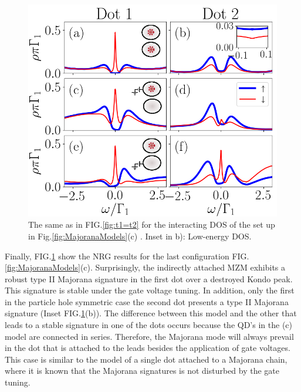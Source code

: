 \documentclass[showpacs,aps,prb,reprint,superscriptaddress]{revtex4-1}
\begin{document}
\begin{figure}[bt]
\begin{center}
\includegraphics[scale=0.45]{Graficos/b)Nt2>0.png}
\caption{  \label{fig:Nt2>0} The same as in FIG.\ref{fig:t1=t2} for the interacting DOS of the set up in Fig.\ref{fig:MajoranaModels}(c) . Inset in b): Low-energy DOS. 
}
%

\end{center}
\end{figure}

    Finally, FIG.\ref{fig:Nt2>0} show the NRG results for the last configuration FIG.\ref{fig:MajoranaModels}(c). Surprisingly, the indirectly attached MZM exhibits a robust type II Majorana signature in the first dot over a destroyed Kondo peak. This signature is stable under the gate voltage tuning. In addition, only the first in the particle hole symmetric case the second dot presents a type II Majorana signature (Inset FIG.\ref{fig:Nt2>0}(b)). The difference between this model and the other that leads to a stable signature in one of the dots occurs because the QD's in the (c) model are connected in series. Therefore, the Majorana mode will always prevail in the dot that is attached to the leads besides the application of gate voltages. This case is similar to the model of a single dot attached to a Majorana chain, where it is known that the Majorana signatures is not disturbed by the gate tuning. 
\end{document}
